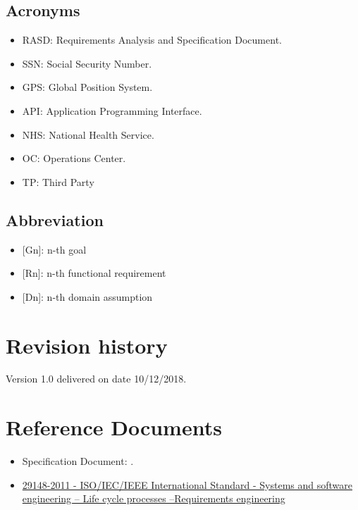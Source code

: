 \subsection{Acronyms}
\begin{itemize}
    \item RASD: Requirements Analysis and Specification Document. 
    \item SSN: Social Security Number.
    \item GPS: Global Position System.
    \item API: Application Programming Interface.
    \item NHS: National Health Service.
    \item OC: Operations Center.
    \item TP: Third Party
\end{itemize}

\subsection{Abbreviation}
\begin{itemize}
    \item {[Gn]}: n-th goal
    \item {[Rn]}: n-th functional requirement
    \item {[Dn]}: n-th domain assumption
\end{itemize}

\section{Revision history}
Version 1.0 delivered on date 10/12/2018.

\section{Reference Documents}
\begin{itemize}
    \item Specification Document: . 
    \item \href{https://ieeexplore.ieee.org/document/6146379} {29148-2011 - ISO/IEC/IEEE International Standard - Systems and software engineering -- Life cycle processes --Requirements engineering}
\end{itemize}

